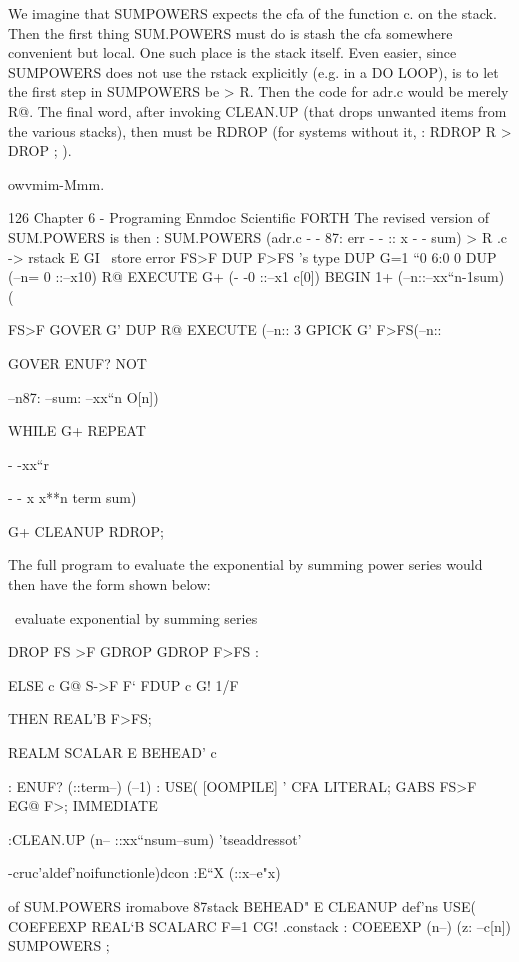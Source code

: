 {We imagine that SUMPOWERS expects the cfa of the function
c. on the stack. Then the first thing SUM.POWERS must do is
stash the cfa somewhere convenient but local. One such place is
the stack itself. Even easier, since SUMPOWERS does not use
the rstack explicitly (e.g. in a DO LOOP), is to let the ﬁrst step
in SUMPOWERS be > R. Then the code for adr.c would be
merely R@. The ﬁnal word, after invoking CLEAN.UP (that
drops unwanted items from the various stacks), then must be
RDROP (for systems without it, : RDROP R > DROP ; ).

owvmim-Mmm.

126 Chapter 6 - Programing Enmdoc Scientiﬁc FORTH
The revised version of SUM.POWERS is then
: SUM.POWERS (adr.c - - 87: err - - :: x - - sum)
> R \adr.c -> rstack
E GI \ store error
FS>F DUP F>FS \getx's type
DUP G=1 \x“0
6:0 0 DUP (--n= 0 ::--x10)
R@ EXECUTE G+ (- -0 ::--x1 c[0])
BEGIN 1+ (--n::--xx“n-1sum)
(

FS>F GOVER G'
DUP R@ EXECUTE (--n::
3 GPICK G' F>FS(--n::

GOVER
ENUF? NOT

--n87: --sum:
--xx“n O[n])

WHILE G+ REPEAT

- -xx“r

- - x x**n term sum)

G+ CLEANUP RDROP;

The full program to evaluate the exponential by summing power
series would then have the form shown below:

 

\ evaluate exponential by summing series

DROP FS >F
GDROP GDROP F>FS :

ELSE c G@ S->F
F‘ FDUP c G! 1/F

 

 

THEN REAL’B F>FS;

REALM SCALAR E BEHEAD' c \hidethisvariahie

: ENUF? (::term--) (--1) : USE( [OOMPILE] ' CFA LITERAL;
GABS FS>F EG@ F>; IMMEDIATE

:CLEAN.UP (n-- ::xx“nsum--sum) \thlsmeam'tseaddressot'

\--cruc'aldef'noifunctionle)dcon
:E“X (::x--e"x) %

 of SUM.POWERS iromabove \erroron87stack
BEHEAD" E CLEANUP \hidethese def'ns USE( COEFEEXP
REAL‘B SCALARC F=1 CG! \adr.constack
: COEEEXP (n--) (z: --c[n]) SUMPOWERS ;

}
